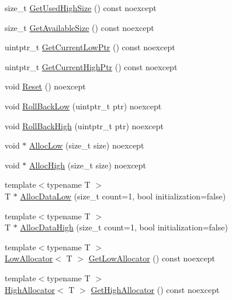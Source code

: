 \begin{DoxyCompactItemize}
\item 
size\+\_\+t \mbox{\hyperlink{classmage_1_1_double_ended_memory_stack_a1c037a0084cfa806c6a519fd3208cd49}{Get\+Used\+High\+Size}} () const noexcept
\item 
size\+\_\+t \mbox{\hyperlink{classmage_1_1_double_ended_memory_stack_a7877cc0fc6a67b610aea51097c44fc8d}{Get\+Available\+Size}} () const noexcept
\item 
uintptr\+\_\+t \mbox{\hyperlink{classmage_1_1_double_ended_memory_stack_a6d2875d28aef082ae6d777a2a39e39a9}{Get\+Current\+Low\+Ptr}} () const noexcept
\item 
uintptr\+\_\+t \mbox{\hyperlink{classmage_1_1_double_ended_memory_stack_aecc40b9efe5a18d0c95ca9d6e063bf38}{Get\+Current\+High\+Ptr}} () const noexcept
\item 
void \mbox{\hyperlink{classmage_1_1_double_ended_memory_stack_a99272e80cde12949a31a2942f9d009d6}{Reset}} () noexcept
\item 
void \mbox{\hyperlink{classmage_1_1_double_ended_memory_stack_ad9d2e796dea54978d1909faf329f839b}{Roll\+Back\+Low}} (uintptr\+\_\+t ptr) noexcept
\item 
void \mbox{\hyperlink{classmage_1_1_double_ended_memory_stack_a0c1981cb1fda455a02148f04be1c3ae8}{Roll\+Back\+High}} (uintptr\+\_\+t ptr) noexcept
\item 
void $\ast$ \mbox{\hyperlink{classmage_1_1_double_ended_memory_stack_a4eece9ca8748f77783e8235c6192b260}{Alloc\+Low}} (size\+\_\+t size) noexcept
\item 
void $\ast$ \mbox{\hyperlink{classmage_1_1_double_ended_memory_stack_ab9750ea9abea18890ef432e9f5893ebf}{Alloc\+High}} (size\+\_\+t size) noexcept
\item 
{\footnotesize template$<$typename T $>$ }\\T $\ast$ \mbox{\hyperlink{classmage_1_1_double_ended_memory_stack_a698edab4ba2213a4482629ab2734689a}{Alloc\+Data\+Low}} (size\+\_\+t count=1, bool initialization=false)
\item 
{\footnotesize template$<$typename T $>$ }\\T $\ast$ \mbox{\hyperlink{classmage_1_1_double_ended_memory_stack_addf70bf7ae94789bd642a3aa7679678f}{Alloc\+Data\+High}} (size\+\_\+t count=1, bool initialization=false)
\item 
{\footnotesize template$<$typename T $>$ }\\\mbox{\hyperlink{classmage_1_1_double_ended_memory_stack_1_1_low_allocator}{Low\+Allocator}}$<$ T $>$ \mbox{\hyperlink{classmage_1_1_double_ended_memory_stack_ada7dfb759df112e0cefccef6f6fc16ee}{Get\+Low\+Allocator}} () const noexcept
\item 
{\footnotesize template$<$typename T $>$ }\\\mbox{\hyperlink{classmage_1_1_double_ended_memory_stack_1_1_high_allocator}{High\+Allocator}}$<$ T $>$ \mbox{\hyperlink{classmage_1_1_double_ended_memory_stack_a802dfc5aa72c11dc2de255f2d85589c7}{Get\+High\+Allocator}} () const noexcept
\end{DoxyCompactItemize}
